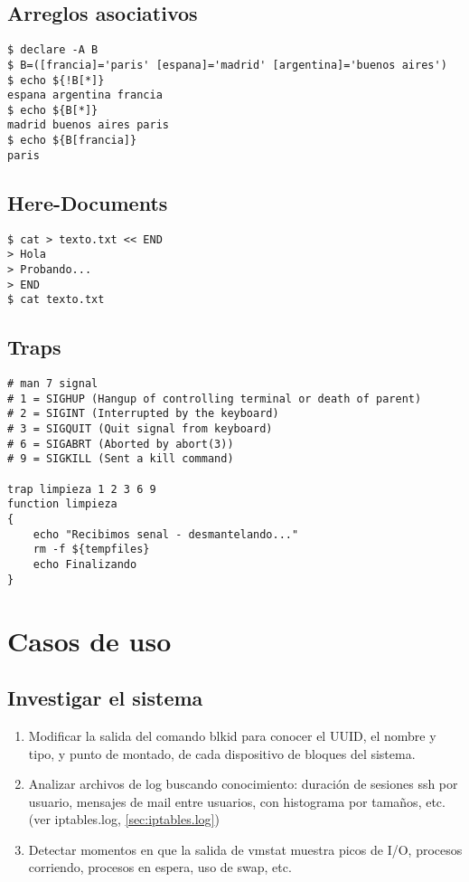 \subsection{Arreglos asociativos}
\begin{lstlisting}
$ declare -A B
$ B=([francia]='paris' [espana]='madrid' [argentina]='buenos aires')
$ echo ${!B[*]}
espana argentina francia
$ echo ${B[*]}
madrid buenos aires paris
$ echo ${B[francia]}
paris
\end{lstlisting}


\subsection{Here-Documents}
\begin{lstlisting}
$ cat > texto.txt << END
> Hola
> Probando...
> END
$ cat texto.txt
\end{lstlisting}

\subsection{Traps}
\begin{lstlisting}
# man 7 signal
# 1 = SIGHUP (Hangup of controlling terminal or death of parent)
# 2 = SIGINT (Interrupted by the keyboard)
# 3 = SIGQUIT (Quit signal from keyboard)
# 6 = SIGABRT (Aborted by abort(3))
# 9 = SIGKILL (Sent a kill command)

trap limpieza 1 2 3 6 9
function limpieza
{
	echo "Recibimos senal - desmantelando..."
	rm -f ${tempfiles}
	echo Finalizando
}
\end{lstlisting}



\section{Casos de uso}


\subsection{Investigar el sistema}
\begin{enumerate}
	\item 
Modificar la salida del comando blkid para conocer el UUID, el nombre y tipo, y punto de montado, de cada dispositivo de bloques del sistema.
	\item 
Analizar archivos de log buscando conocimiento: duración de sesiones ssh por usuario, mensajes de mail entre usuarios, con histograma por tamaños, etc. (ver iptables.log, \ref{sec:iptables.log})
	\item 
Detectar momentos en que la salida de vmstat muestra picos de I/O, procesos corriendo, procesos en espera, uso de swap, etc.
\end{enumerate}


